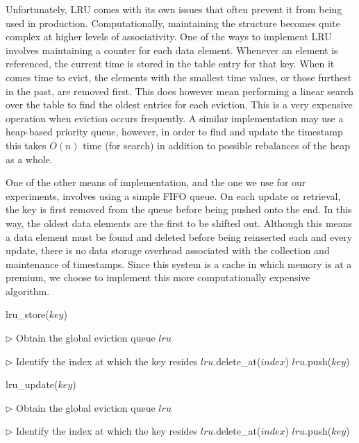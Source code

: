 Unfortunately, LRU comes with its own issues that often prevent it from being
used in production. Computationally, maintaining the structure becomes quite
complex at higher levels of
associativity\cite{zhang_cache_schemes,deville_replacement}. One of the ways
to implement LRU involves maintaining a counter for each data element.
Whenever an element is referenced, the current time is stored in the table
entry for that key. When it comes time to evict, the elements with the smallest
time values, or those furthest in the past, are removed first. This does
however mean performing a linear search over the table to find the oldest
entries for each eviction. This is a very expensive operation when eviction
occurs frequently. A similar implementation may use a heap-based priority
queue, however, in order to find and update the timestamp this takes $O(n)$
time (for search) in addition to possible rebalances of the heap as a whole.

One of the other means of implementation, and the one we use for our
experiments, involves using a simple FIFO queue. On each update or retrieval,
the key is first removed from the queue before being pushed onto the end. In
this way, the oldest data elements are the first to be shifted out. Although
this means a data element must be found and deleted before being reinserted
each and every update, there is no data storage overhead associated with the
collection and maintenance of timestamps. Since this system is a cache in which
memory is at a premium, we choose to implement this more computationally
expensive algorithm.

\begin{algorithm}[htp]
\small
\caption{\label{alg:lru_store}lru\_store($key$)}
\begin{algorithmic}[1]
\STATE $\triangleright$ Obtain the global eviction queue $lru$

\STATE $\triangleright$ Identify the index at which the key resides
  \STATE $lru$.delete\_at($index$)
\ENDIF
\STATE $lru$.push($key$)
\end{algorithmic}
\end{algorithm}

\begin{algorithm}[htp]
\small
\caption{\label{alg:lru_update}lru\_update($key$)}
\begin{algorithmic}[1]
\STATE $\triangleright$ Obtain the global eviction queue $lru$

\STATE $\triangleright$ Identify the index at which the key resides
  \STATE $lru$.delete\_at($index$)
  \STATE $lru$.push($key$)
\ENDIF
\end{algorithmic}
\end{algorithm}

